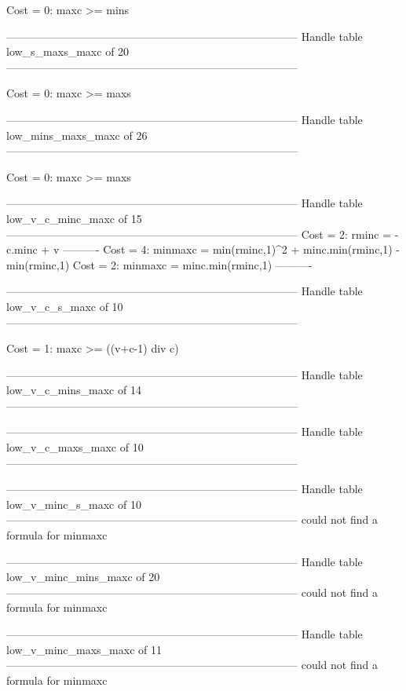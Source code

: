 Cost =  0:  maxc >= mins

--------------------------------------------------------------------------------
Handle table low_s_maxs_maxc of 20
--------------------------------------------------------------------------------

Cost =  0:  maxc >= maxs

--------------------------------------------------------------------------------
Handle table low_mins_maxs_maxc of 26
--------------------------------------------------------------------------------

Cost =  0:  maxc >= maxs

--------------------------------------------------------------------------------
Handle table low_v_c_minc_maxc of 15
--------------------------------------------------------------------------------
Cost =  2:  rminc   = -c.minc + v
----------
Cost =  4:  minmaxc = min(rminc,1)^2 + minc.min(rminc,1) - min(rminc,1)
Cost =  2:  minmaxc = minc.min(rminc,1)
----------


--------------------------------------------------------------------------------
Handle table low_v_c_s_maxc of 10
--------------------------------------------------------------------------------

Cost =  1:  maxc >= ((v+c-1) div c)

--------------------------------------------------------------------------------
Handle table low_v_c_mins_maxc of 14
--------------------------------------------------------------------------------


--------------------------------------------------------------------------------
Handle table low_v_c_maxs_maxc of 10
--------------------------------------------------------------------------------


--------------------------------------------------------------------------------
Handle table low_v_minc_s_maxc of 10
--------------------------------------------------------------------------------
could not find a formula for minmaxc


--------------------------------------------------------------------------------
Handle table low_v_minc_mins_maxc of 20
--------------------------------------------------------------------------------
could not find a formula for minmaxc


--------------------------------------------------------------------------------
Handle table low_v_minc_maxs_maxc of 11
--------------------------------------------------------------------------------
could not find a formula for minmaxc


